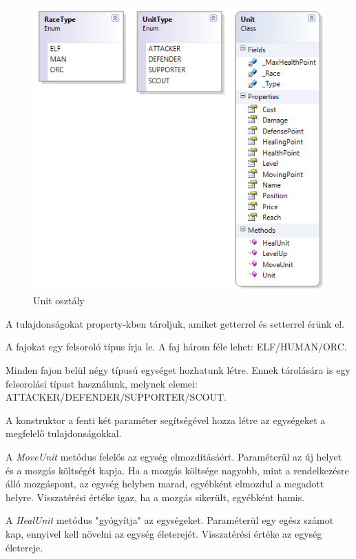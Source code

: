 \documentclass[a4paper,12pt]{report}
\begin{document}
\begin{figure}[hbtp]
\centering
\includegraphics[width=1\textwidth]{Unit.png}
\caption{Unit osztály}
\label{fig:unitclass}
\end{figure}

A tulajdonságokat property-kben tároljuk, amiket getterrel és setterrel érünk el.

A fajokat egy felsoroló típus írja le. A faj három féle lehet: ELF/HUMAN/ORC.

Minden fajon belül négy típusú egységet hozhatunk létre. Ennek tárolására is egy felsorolási típust használunk, melynek elemei: ATTACKER/DEFENDER/SUPPORTER/SCOUT.

A konstruktor a fenti két paraméter segítségével hozza létre az egységeket a megfelelő tulajdonságokkal.

A \textit{MoveUnit} metódus felelős az egység elmozdításáért. Paraméterül az új helyet és a mozgás költségét kapja. Ha a mozgás költsége nagyobb, mint a rendelkezésre álló mozgáspont, az egység helyben marad, egyébként elmozdul a megadott helyre. Visszatérési értéke igaz, ha a mozgás sikerült, egyébként hamis.

A \textit{HealUnit} metódus "gyógyítja" az egységeket. Paraméterül egy egész számot kap, ennyivel kell növelni az egység életerejét. Visszatérési értéke az egység életereje.
\end{document}
